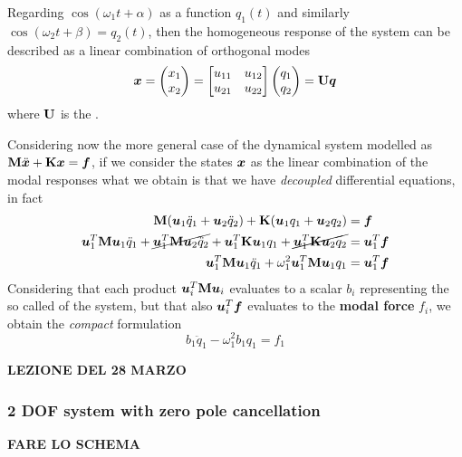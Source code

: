 	Regarding $\cos(\omega_1 t + \alpha)$ as a function $q_1(t)$ and similarly $\cos(\omega_2 t + \beta) = q_2(t)$, then the homogeneous response of the system can be described as a linear combination of orthogonal modes
	\begin{equation}
		\boldsymbol{x} = \begin{pmatrix} x_1 \\ x_2 \end{pmatrix} = \begin{bmatrix} u_{11} & u_{12} \\ u_{21} & u_{22}  \end{bmatrix} \begin{pmatrix} q_1 \\ q_2 \end{pmatrix} = \mathbf{U} \boldsymbol{q}
	\end{equation}
	where $\mathbf{U}$ is the .
	
	Considering now the more general case of the dynamical system modelled as $\mathbf{M} \ddot{\boldsymbol{x}} + \mathbf{K} \boldsymbol{x} = \boldsymbol{f}$, if we consider the states $\boldsymbol{x}$ as the linear combination of the modal responses what we obtain is that we have \textit{decoupled} differential equations, in fact
	\begin{align*}
		\mathbf{M} (\boldsymbol{u}_1 \ddot q_1 + \boldsymbol{u}_2 \ddot q_2) + \mathbf{K}(\boldsymbol{u}_1  q_1 + \boldsymbol{u}_2  q_2)  & = \boldsymbol{f} \\
		\boldsymbol{u}_1^T \mathbf{M} \boldsymbol{u}_1 \ddot q_1 + \cancel{\boldsymbol{u}_1^T \mathbf{M} \boldsymbol{u}_2 \ddot q_2} + \boldsymbol{u}_1^T \mathbf{K} \boldsymbol{u}_1  q_1 + \cancel{ \boldsymbol{u}_1^T \mathbf{K} \boldsymbol{u}_2  q_2}  & = \boldsymbol{u}_1^T\boldsymbol{f} \\
		\boldsymbol{u}_1^T \mathbf{M} \boldsymbol{u}_1 \ddot q_1 + \omega_1^2 \boldsymbol{u}_1^T \mathbf{M} \boldsymbol{u}_1  q_1  & = \boldsymbol{u}_1^T\boldsymbol{f}
	\end{align*}
	Considering that each product $\boldsymbol{u}_i^T \mathbf{M} \boldsymbol{u}_i$ evaluates to a scalar $b_i$ representing the so called  of the system, but that also $\boldsymbol{u}_i^T \boldsymbol{f}$ evaluates to the \textbf{modal force} $f_i$, we obtain the \textit{compact} formulation
	\[ b_1 \ddot q_1 - \omega_1^2 b_1 q_1 = f_1 \]
		
		
	\textbf{LEZIONE DEL 28 MARZO}
	
	\subsubsection{2 DOF system with zero pole cancellation}
		
		\textbf{FARE LO SCHEMA}
		
